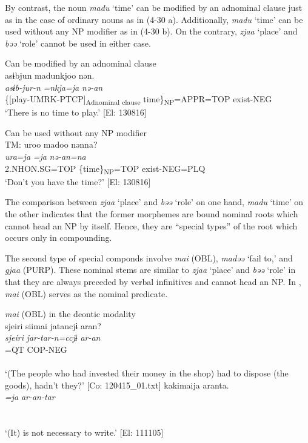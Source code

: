 By contrast, the noun \textit{madu} ‘time’ can be modified by an adnominal clause just as in the case of ordinary nouns as in (4-30 a). Additionally, \textit{madu} ‘time’ can be used without any NP modifier as in (4-30 b). On the contrary, \textit{zjaa} ‘place’ and \textit{bəə} ‘role’ cannot be used in either case.

\ea \label{ex:4.30}
\ea Can be modified by an adnominal clause\\\label{ex:4.30a}
\glll  asɨbjun  madunkjoo  nən.\\
    \textit{asɨb-jur-n}  \textit{=nkja=ja}  \textit{nə-an}\\
    \{[play-UMRK-PTCP]\textsubscript{Adnominal clause} time\}\textsubscript{NP}=APPR=TOP  exist-NEG\\
    \glt     ‘There is no time to play.’ [El: 130816]

\ex Can be used without any NP modifier\\\label{ex:4.30b}
\glll  TM:  uroo  madoo  nənna?\\
    \textit{ura=ja}  \textit{=ja}  \textit{nə-an=na}\\
    2.NHON.SG=TOP\textsubscript{} \{time\}\textsubscript{NP}=TOP  exist-NEG=PLQ\\
    \glt     ‘Don’t you have the time?’ [El: 130816]
\z
\z

The comparison between \textit{zjaa} ‘place’ and \textit{bəə} ‘role’ on one hand, \textit{madu} ‘time’ on the other indicates that the former morphemes are bound nominal roots which cannot head an NP by itself. Hence, they are “special types” of the root which occurs only in compounding.

The second type of special componds involve \textit{mai} (OBL), \textit{madəə} ‘fail to,’ and \textit{gjaa} (PURP). These nominal stems are similar to \textit{zjaa} ‘place’ and \textit{bəə} ‘role’ in that they are always preceded by verbal infinitives and cannot head an NP. In , \textit{mai} (OBL) serves as the nominal predicate. 

\ea  \textit{mai} (OBL) in the deontic modality \label{ex:4.31}
  \ea{}\\
\gllll {\textbar}sjeiri{\textbar}  siimai  jatancjɨ  aran?\\
      \textit{sjeiri}  \textit{}  \textit{jar-tar-n=ccjɨ}  \textit{ar-an}\\
      [disposal  do-INF+OBL  COP-PST-PTCP]=QT  COP-NEG\\
      [Nominal predicate]  \\
      \glt       ‘(The people who had invested their money in the shop) had to dispose (the goods), hadn’t they?’ [Co: 120415\_01.txt]
\ex \label{ex:4.31b}%
\gllll kakimaija  aranta.\\
      \textit{=ja}  \textit{ar-an-tar}\\
      [write-INF+OBL=TOP  COP-NEG-PST]\\
      [Nominal predicate]\\
      \glt       ‘(It) is not necessary to write.’ [El: 111105]
    \z
\z

